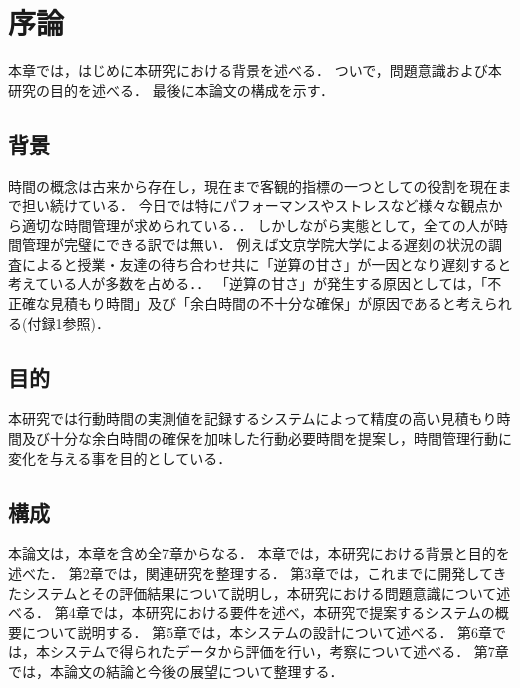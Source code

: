 \chapter{序論}
本章では，はじめに本研究における背景を述べる．
ついで，問題意識および本研究の目的を述べる．
最後に本論文の構成を示す．

\section{背景}
時間の概念は古来から存在し，現在まで客観的指標の一つとしての役割を現在まで担い続けている\cite{history}．
今日では特にパフォーマンスやストレスなど様々な観点から適切な時間管理が求められている．\cite{Barling1996}\cite{Britton1991}\cite{Burt1994}\cite{Macan1994}．
しかしながら実態として，全ての人が時間管理が完璧にできる訳では無い．
例えば文京学院大学による遅刻の状況の調査によると授業・友達の待ち合わせ共に「逆算の甘さ」が一因となり遅刻すると考えている人が多数を占める．\cite{bunkyo}．
「逆算の甘さ」が発生する原因としては，「不正確な見積もり時間」及び「余白時間の不十分な確保」が原因であると考えられる(付録1参照)．


\section{目的}
本研究では行動時間の実測値を記録するシステムによって精度の高い見積もり時間及び十分な余白時間の確保を加味した行動必要時間を提案し，時間管理行動に変化を与える事を目的としている．

\section{構成}
本論文は，本章を含め全7章からなる．
本章では，本研究における背景と目的を述べた．
第2章では，関連研究を整理する．
第3章では，これまでに開発してきたシステムとその評価結果について説明し，本研究における問題意識について述べる．
第4章では，本研究における要件を述べ，本研究で提案するシステムの概要について説明する．
第5章では，本システムの設計について述べる．
第6章では，本システムで得られたデータから評価を行い，考察について述べる．
第7章では，本論文の結論と今後の展望について整理する．